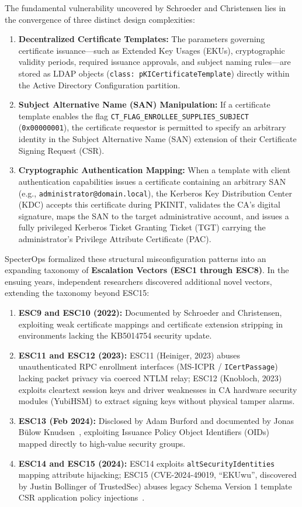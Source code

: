 The fundamental vulnerability uncovered by Schroeder and Christensen lies in the convergence of three distinct design complexities:
\begin{enumerate}
    \item \textbf{Decentralized Certificate Templates:} The parameters governing certificate issuance---such as Extended Key Usages (EKUs), cryptographic validity periods, required issuance approvals, and subject naming rules---are stored as LDAP objects (\texttt{class: pKICertificateTemplate}) directly within the Active Directory Configuration partition.
    \item \textbf{Subject Alternative Name (SAN) Manipulation:} If a certificate template enables the flag \texttt{CT\_FLAG\_ENROLLEE\_SUPPLIES\_SUBJECT} (\texttt{0x00000001}), the certificate requestor is permitted to specify an arbitrary identity in the Subject Alternative Name (SAN) extension of their Certificate Signing Request (CSR).
    \item \textbf{Cryptographic Authentication Mapping:} When a template with client authentication capabilities issues a certificate containing an arbitrary SAN (e.g., \texttt{administrator@domain.local}), the Kerberos Key Distribution Center (KDC) accepts this certificate during PKINIT, validates the CA's digital signature, maps the SAN to the target administrative account, and issues a fully privileged Kerberos Ticket Granting Ticket (TGT) carrying the administrator's Privilege Attribute Certificate (PAC).
\end{enumerate}

SpecterOps formalized these structural misconfiguration patterns into an expanding taxonomy of \textbf{Escalation Vectors (ESC1 through ESC8)}. In the ensuing years, independent researchers discovered additional novel vectors, extending the taxonomy beyond ESC15:
\begin{enumerate}
    \item \textbf{ESC9 and ESC10 (2022):} Documented by Schroeder and Christensen, exploiting weak certificate mappings and certificate extension stripping in environments lacking the KB5014754 security update.
    \item \textbf{ESC11 and ESC12 (2023):} ESC11 (Heiniger, 2023) abuses unauthenticated RPC enrollment interfaces (MS-ICPR / \texttt{ICertPassage}) lacking packet privacy via coerced NTLM relay; ESC12 (Knobloch, 2023) exploits cleartext session keys and driver weaknesses in CA hardware security modules (YubiHSM) to extract signing keys without physical tamper alarms.
    \item \textbf{ESC13 (Feb 2024):} Disclosed by Adam Burford and documented by Jonas B{\"u}low Knudsen~\cite{knudsen2024esc13}, exploiting Issuance Policy Object Identifiers (OIDs) mapped directly to high-value security groups.
    \item \textbf{ESC14 and ESC15 (2024):} ESC14 exploits \texttt{altSecurityIdentities} mapping attribute hijacking; ESC15 (CVE-2024-49019, ``EKUwu'', discovered by Justin Bollinger of TrustedSec) abuses legacy Schema Version 1 template CSR application policy injections~\cite{bollinger2024ekuwu}.
\end{enumerate}

